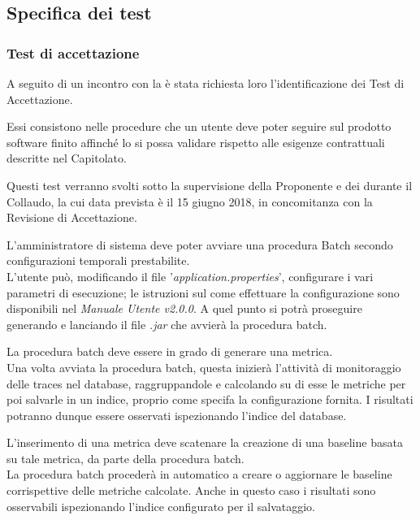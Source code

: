 \subsection{Specifica dei test} \label{sec:test}
	\subsubsection{Test di accettazione}\label{testAccettazione}
		A seguito di un incontro con la  \Proponente{} è stata richiesta loro l'identificazione dei Test di Accettazione.

		Essi consistono nelle procedure che un utente deve poter seguire sul prodotto software finito affinché
		lo si possa validare rispetto alle esigenze contrattuali descritte nel Capitolato.
	
		Questi test verranno svolti sotto la supervisione della Proponente e dei  durante il Collaudo, la
		cui data prevista è il 15 giugno 2018, in concomitanza con la Revisione di Accettazione.

		 L’amministratore di sistema deve poter avviare una procedura Batch secondo configurazioni temporali prestabilite. \\
		L'utente può, modificando il file '\textit{application.properties}', configurare i vari parametri di esecuzione; le istruzioni sul come effettuare la configurazione sono disponibili nel \textit{Manuale Utente v2.0.0}. A quel punto si potrà proseguire generando e lanciando il file \textit{.jar} che avvierà la procedura batch.

		 La procedura batch deve essere in grado di generare una metrica. \\
		Una volta avviata la procedura batch, questa inizierà l'attività di monitoraggio delle traces nel database, raggruppandole e calcolando su di esse le metriche per poi salvarle in un indice, proprio come specifa la configurazione fornita. I risultati potranno dunque essere osservati ispezionando l'indice del database. 

		 L’inserimento di una metrica deve scatenare la creazione di una baseline basata su tale metrica, da parte della procedura batch. \\
		La procedura batch procederà in automatico a creare o aggiornare le baseline corrispettive delle metriche calcolate. Anche in questo caso i risultati sono osservabili ispezionando l'indice configurato per il salvataggio.

